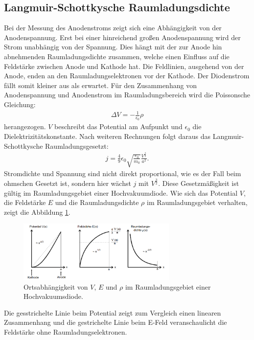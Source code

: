 \subsection{Langmuir-Schottkysche Raumladungsdichte}
Bei der Messung des Anodenstroms zeigt sich eine Abhängigkeit von der Anodenspannung.
Erst bei einer hinreichend großen Anodenspannung wird der Strom unabhängig von der Spannung.
Dies hängt mit der zur Anode hin abnehmenden Raumladungsdichte zusammen, welche einen Einfluss
auf die Feldstärke zwischen Anode und Kathode hat. Die Feldlinien, ausgehend von der Anode, enden
an den Raumladungselektronen vor der Kathode. Der Diodenstrom fällt somit kleiner aus als erwartet.
Für den Zusammenhang von Anodenspannung und Anodenstrom im Raumladungsbereich wird die
Poissonsche Gleichung:
\begin{align}
\Delta V =-\frac{1}{\epsilon_\mathrm{0}}\rho
\end{align}
herangezogen. $V$ beschreibt das Potential am Aufpunkt und $\epsilon_\mathrm{0}$ die Dielektrizitätskonstante.
Nach weiteren Rechnungen folgt daraus das Langmuir-Schottkysche Raumladungsgesetzt:
\begin{align}
j=\frac{4}{9}\epsilon_\mathrm{0}\sqrt{\frac{e_\mathrm{0}}{m_\mathrm{0}}}\frac{V^{\frac{3}{2}}}{a^2} .\label{eqn:LRS}
\end{align}
Stromdichte und Spannung sind nicht direkt proportional, wie es der Fall beim ohmschen Gesetzt ist, sondern
hier wächst $j$ mit $V^{\frac{3}{2}}$. Diese Gesetzmäßigkeit ist gültig im Raumladungsgebiet einer Hochvakuumdiode.
Wie sich das Potential $V$, die Feldstärke $E$ und die Raumladungsdichte $\rho$ im Raumladungsgebiet
verhalten, zeigt die Abbildung \ref{fig:verlauf}.
\begin{figure}
 \centering
 \includegraphics[width=0.7\textwidth]{verlauf.png}
 \caption{Ortsabhängigkeit von $V$, $E$ und $\rho$ im Raumladungsgebiet einer Hochvakuumsdiode.\cite{sample}}
 \label{fig:verlauf}
 \end{figure}
 \FloatBarrier
Die gesstrichelte Linie beim Potential zeigt zum Vergleich einen linearen Zusammenhang
und die gestrichelte Linie beim E-Feld veranschaulicht die Feldstärke ohne Raumladungselektronen.

